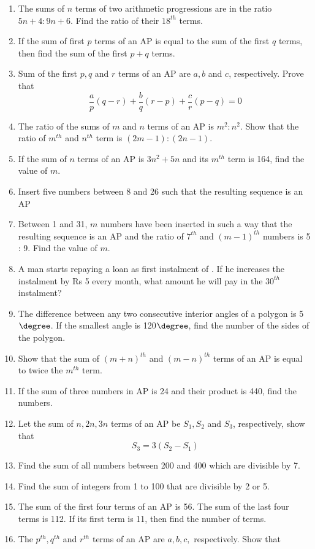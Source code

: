 \begin{enumerate}[label=\thesubsection.\arabic*, ref=\thesubsection.\theenumi]
\item The sums of $n$ terms of two arithmetic progressions are in the ratio $5n + 4 : 9n + 6$. Find the ratio of their $18^{th}$ terms.
\item If the sum of first $p$ terms of an AP is equal to the sum of the first $q$ terms,  then find the sum of the first $p + q$ terms.
\item Sum of the first $p,  q$ and $r$ terms of an AP are $a,  b$ and $c$,  respectively. Prove that
$$\frac{a}{p}(q-r)+\frac{b}{q}(r-p)+\frac{c}{r}(p-q) = 0$$
\item The ratio of the sums of $m$ and $n$ terms of an AP is $m^2 : n^2$. Show that the ratio of 
$m^{th}$ and $n^{th}$ term is $(2m - 1) : (2n - 1)$.
\item If the sum of $n$ terms of an AP is $3n^2 + 5n$ and its $m^{th}$ term is 164,  find the value
of $m$.
\item Insert five numbers between 8 and 26 such that the resulting sequence is an AP
\item Between 1 and 31,  $m$ numbers have been inserted in such a way that the resulting sequence is an AP and the ratio of $7^{th}$ and $(m - 1)^{th}$ numbers is 5 : 9. Find the value of $m$.
\item A man starts repaying a loan as first instalment of . If he increases the
instalment by Rs 5 every month,  what amount he will pay in the $30^{th}$ instalment?
\item The difference between any two consecutive interior angles of a polygon is 5$\degree$. If the smallest angle is 120$\degree$,  find the number of the sides of the polygon. 
\item Show that the sum of $(m + n)^{th}$ and $(m - n)^{th}$ terms of an AP is equal to twice the $m^{th}$ term.
\item If the sum of three numbers in AP  is 24 and their product is 440,  find the numbers.
\item Let the sum of $n,  2n,  3n$ terms of an AP be $S_1,  S_2$ and $S_3$,  respectively,  show that 
$$S_3 = 3(S_2 - S_1)$$
\item Find the sum of all numbers between 200 and 400 which are divisible by 7.
\item Find the sum of integers from 1 to 100 that are divisible by 2 or 5.
\item  The sum of the first four terms of an AP  is 56. The sum of the last four terms is 112. If its first term is 11, then find the number of terms.
\item The $p^{th}, q^{th}$ and $r^{th}$ terms of an AP  are $a, b, c,$ respectively. Show that 

\end{enumerate}
